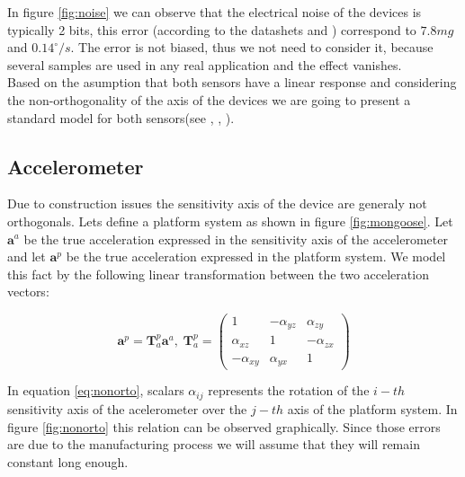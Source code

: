 \documentclass[conference]{IEEEtran}
\begin{document}
In figure \ref{fig:noise} we can observe that the electrical noise of the devices is typically 2 bits, this error (according to the datashets \cite{bib:acc_data} and \cite{bib:gyro_data}) correspond to $7.8 mg$ and $0.14 ^{\circ}/s $. The error is not biased, thus we not need to consider it, because several samples are used in any real application and the effect vanishes.\\

Based on the asumption that both sensors have a linear response and considering the non-orthogonality of the axis of the devices we are going to present a standard model for both sensors(see \cite{bib:calib_imu}, \cite{bib:kalman}, \cite{bib:calib_imu_dos}).

\subsection{Accelerometer}
Due to construction issues the sensitivity axis of the device are generaly not orthogonals. Lets define a platform system as shown in figure \ref{fig:mongoose}. Let $\mathbf{a}^a$ be the true acceleration expressed in the sensitivity axis of the accelerometer and let $\mathbf{a}^p$ be the true acceleration expressed in the platform system. We model this fact by the following linear transformation between the two acceleration vectors:

\begin{equation}
\mathbf{a}^p = \mathbf{T}_a^p\mathbf{a}^a, \; \mathbf{T}_a^p = \left(\begin{array}{ccc}
1 & - \alpha_{yz} & \alpha_{zy}\\
\alpha_{xz} & 1 & - \alpha_{zx}\\
-\alpha_{xy} & \alpha_{yx} & 1
\end{array}\right)
\label{eq:nonorto}
\end{equation}

In equation \ref{eq:nonorto}, scalars $\alpha_{ij}$ represents the rotation of the $i-th$ sensitivity axis of the acelerometer over the $j-th$ axis of the platform system. In figure \ref{fig:nonorto} this relation can be observed graphically. Since those errors are due to the manufacturing process we will assume that they will remain constant long enough.
\end{document}
